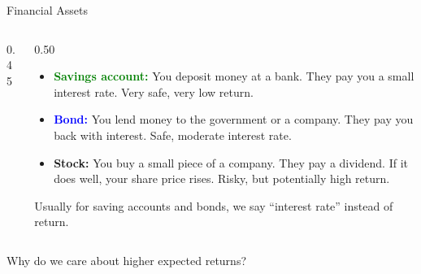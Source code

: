 \documentclass[9pt,english,aspectratio=169]{beamer}
\begin{document}
\begin{frame}{Financial Assets}

  \begin{columns}[T]
    \begin{column}{0.45\textwidth}
      \vspace{0.5em}
    \end{column}
    \begin{column}{0.50\textwidth}
      \begin{itemize}
        \item \textcolor{green}{\textbf{Savings account:}} You deposit money at a bank. They pay you a small interest rate. Very safe, very low return.

        \vspace{0.5em}
        \item \textcolor{blue}{\textbf{Bond:}} You lend money to the government or a company. They pay you back with interest. Safe, moderate interest rate.

        \vspace{0.5em}
        \item \textcolor{vermillion}{\textbf{Stock:}} You buy a small piece of a company. They pay a dividend. If it does well, your share price rises. Risky, but potentially high return.
      \end{itemize}
    \pause 
    \begin{insightbox}
      Usually for saving accounts and bonds, we say ``interest rate'' instead of return. 
    \end{insightbox}
    \end{column}
  \end{columns}

  \pause 
  \begin{questionbox}
    Why do we care about higher expected returns?
  \end{questionbox}
\end{frame}
\end{document}
